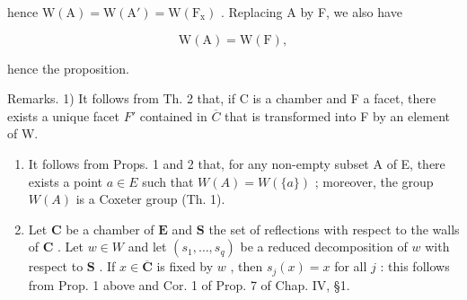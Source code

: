hence \(\mathrm{W(A) = W(A') = W(F_x)}\) . Replacing A by F, we also have

\[
\mathrm{W} (\mathrm{A}) = \mathrm{W} (\mathrm{F}),
\]

hence the proposition.

Remarks. 1) It follows from Th. 2 that, if C is a chamber and F a facet, there exists a unique facet \(F'\) contained in \(\overline{C}\) that is transformed into F by an element of W.

\begin{enumerate}
\def\labelenumi{\arabic{enumi})}
\setcounter{enumi}{1}
\item
  It follows from Props. 1 and 2 that, for any non-empty subset A of E, there exists a point \(a \in E\) such that \(W(A) = W(\{a\})\) ; moreover, the group \(W(A)\) is a Coxeter group (Th. 1).
\item
  Let \(\mathbf{C}\) be a chamber of \(\mathbf{E}\) and \(\mathbf{S}\) the set of reflections with respect to the walls of \(\mathbf{C}\) . Let \(w \in W\) and let \((s_1, \ldots, s_q)\) be a reduced decomposition of \(w\) with respect to \(\mathbf{S}\) . If \(x \in \overline{\mathbf{C}}\) is fixed by \(w\) , then \(s_j(x) = x\) for all \(j\) : this follows from Prop. 1 above and Cor. 1 of Prop. 7 of Chap. IV, §1.
\end{enumerate}

